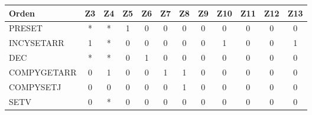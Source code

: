 \documentclass[12pt,a4paper,oneside]{article}
\begin{document}
\begin{table}[H]
    \begin{tabular}{|l|ccccccccccc|}
    \hline
    Orden           & \multicolumn{1}{l}{Z3}  & \multicolumn{1}{l}{Z4}  & \multicolumn{1}{l}{Z5}  & \multicolumn{1}{l}{Z6}  & \multicolumn{1}{l}{Z7}  & \multicolumn{1}{l}{Z8}  & \multicolumn{1}{l}{Z9}  & \multicolumn{1}{l}{Z10} & \multicolumn{1}{l}{Z11} & \multicolumn{1}{l}{Z12} & \multicolumn{1}{l|}{Z13} \\ \hline
    PRESET          & *                       & *                       & 1                       & 0                       & 0                       & 0                       & 0                       & 0                        & 0                       & 0                       & 0                       \\ \cline{1-2} \hline
    INCYSETARR      & 1                       & *                       & 0                       & 0                       & 0                       & 0                       & 0                       & 1                        & 0                       & 0                       & 1                       \\ \cline{1-2} \hline
    DEC             & *                       & *                       & 0                       & 1                       & 0                       & 0                       & 0                       & 0                        & 0                       & 0                       & 0                       \\ \cline{1-2} \hline
    COMPYGETARR     & 0                       & 1                       & 0                       & 0                       & 1                       & 1                       & 0                       & 0                        & 0                       & 0                       & 0                       \\ \cline{1-2} \hline
    COMPYSETJ       & 0                       & 0                       & 0                       & 0                       & 0                       & 1                       & 0                       & 0                        & 0                       & 0                       & 0                       \\ \cline{1-2} \hline
    SETV            & 0                       & *                       & 0                       & 0                       & 0                       & 0                       & 0                       & 0                        & 0                       & 0                       & 0                       \\ \cline{1-2} \hline

\end{tabular}
\end{table}
\end{document}
